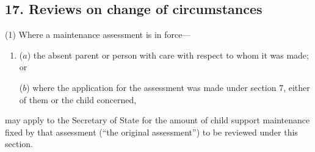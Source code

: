 \documentclass[12pt,a4paper]{article}
\begin{document}

%
%
%
%
%
%
%
%

\subsection{17. Reviews on change of circumstances}

(1) Where a maintenance assessment is in force—
\begin{enumerate}\item[]
($a$) the absent parent or person with care with respect to whom it was made; or

($b$) where the application for the assessment was made under section 7, either of them or the child concerned,
\end{enumerate}
may apply to the Secretary of State for the amount of child support maintenance fixed by that assessment (“the original assessment”) to be reviewed under this section.
\end{document}
